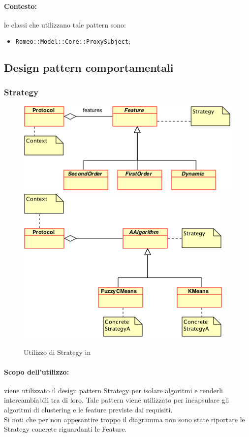 	\paragraph{Contesto:} le classi che utilizzano tale pattern sono:
		\begin{itemize}
			\item \verb!Romeo::Model::Core::ProxySubject!;
		\end{itemize}
\pagebreak

\subsection{Design pattern comportamentali}
\label{patt_comp}
\subsubsection{Strategy}
\label{comp_strat}
\begin{figure}[!h]
			\centering
			\includegraphics[width=0.6\linewidth]{./Content/Immagini/StrategyFeatures.png}
			\includegraphics[width=0.6\linewidth]{./Content/Immagini/StrategyAlgorithms.png}
			\caption{Utilizzo di Strategy in \project{}}
		\label{romeo_strategy}
\end{figure}
\paragraph{Scopo dell'utilizzo:} viene utilizzato il design pattern\glossario{} Strategy per isolare algoritmi e renderli intercambiabili tra di loro. Tale pattern viene utilizzato per incapsulare gli algoritmi di clustering\g{} e le feature\g{} previste dai requisiti.
\\Si noti che per non appesantire troppo il diagramma non sono state riportare le Strategy concrete riguardanti le Feature\g{}.

